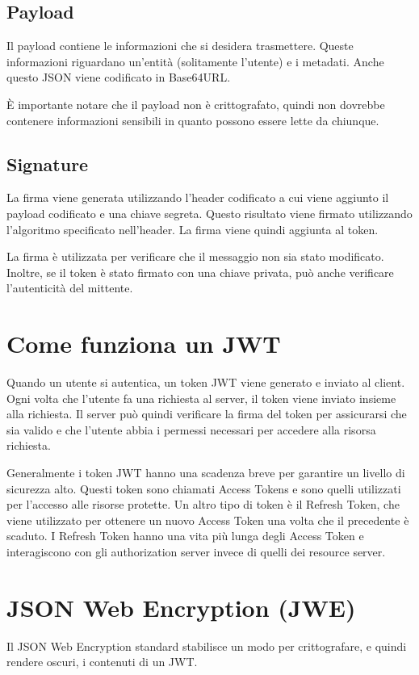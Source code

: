 \documentclass{article}
\begin{document}
\subsection{Payload}

Il payload contiene le informazioni che si desidera trasmettere.
Queste informazioni riguardano un'entità (solitamente l'utente) e i metadati.
Anche questo JSON viene codificato in Base64URL.

È importante notare che il payload non è crittografato, quindi non dovrebbe contenere informazioni sensibili in quanto possono essere lette da chiunque.

\subsection{Signature}
La firma viene generata utilizzando l'header codificato a cui viene aggiunto il payload codificato e una chiave segreta.
Questo risultato viene firmato utilizzando l'algoritmo specificato nell'header.
La firma viene quindi aggiunta al token.

La firma è utilizzata per verificare che il messaggio non sia stato modificato.
Inoltre, se il token è stato firmato con una chiave privata, può anche verificare l'autenticità del mittente.

\section{Come funziona un JWT}
Quando un utente si autentica, un token JWT viene generato e inviato al client.
Ogni volta che l'utente fa una richiesta al server, il token viene inviato insieme alla richiesta.
Il server può quindi verificare la firma del token per assicurarsi che sia valido e che l'utente abbia i permessi necessari per accedere alla risorsa richiesta.

Generalmente i token JWT hanno una scadenza breve per garantire un livello di sicurezza alto.
Questi token sono chiamati Access Tokens e sono quelli utilizzati per l'accesso alle risorse protette.
Un altro tipo di token è il Refresh Token, che viene utilizzato per ottenere un nuovo Access Token una volta che il precedente è scaduto.
I Refresh Token hanno una vita più lunga degli Access Token e interagiscono con gli authorization server invece di quelli dei resource server.

\section{JSON Web Encryption (JWE)}
Il JSON Web Encryption standard stabilisce un modo per crittografare, e quindi rendere oscuri, i contenuti di un JWT.
\end{document}
